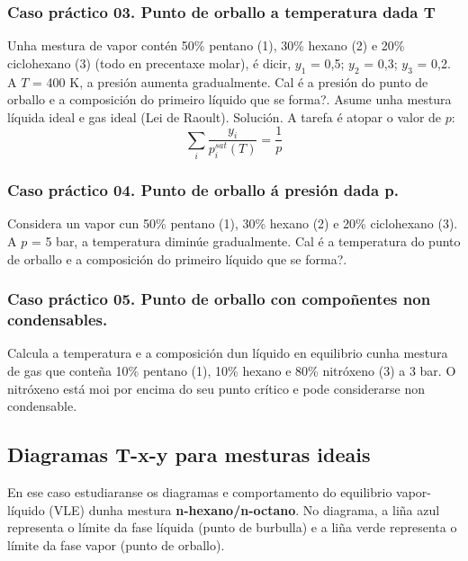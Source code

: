 \documentclass[
  letterpaper,
  DIV=11,
  numbers=noendperiod]{scrartcl}
\begin{document}
\subsubsection{Caso práctico 03. Punto de orballo a temperatura dada
T}\label{caso-pruxe1ctico-03.-punto-de-orballo-a-temperatura-dada-t}

Unha mestura de vapor contén 50\% pentano (1), 30\% hexano (2) e 20\%
ciclohexano (3) (todo en precentaxe molar), é dicir, \(y_1\) = 0,5;
\(y_2\) = 0,3; \(y_3\) = 0,2. A \(T\) = 400 K, a presión aumenta
gradualmente. Cal é a presión do punto de orballo e a composición do
primeiro líquido que se forma?. Asume unha mestura líquida ideal e gas
ideal (Lei de Raoult). Solución. A tarefa é atopar o valor de \(p\): \[
\sum_i \frac {y_i} {p_i^{sat} (T)} = \frac {1} {p}
\]

\subsubsection{Caso práctico 04. Punto de orballo á presión dada
p.}\label{caso-pruxe1ctico-04.-punto-de-orballo-uxe1-presiuxf3n-dada-p.}

Considera un vapor cun 50\% pentano (1), 30\% hexano (2) e 20\%
ciclohexano (3). A \(p\) = 5 bar, a temperatura diminúe gradualmente.
Cal é a temperatura do punto de orballo e a composición do primeiro
líquido que se forma?.

\subsubsection{Caso práctico 05. Punto de orballo con compoñentes non
condensables.}\label{caso-pruxe1ctico-05.-punto-de-orballo-con-compouxf1entes-non-condensables.}

Calcula a temperatura e a composición dun líquido en equilibrio cunha
mestura de gas que conteña 10\% pentano (1), 10\% hexano e 80\%
nitróxeno (3) a 3 bar. O nitróxeno está moi por encima do seu punto
crítico e pode considerarse non condensable.

\subsection{Diagramas T-x-y para mesturas
ideais}\label{diagramas-t-x-y-para-mesturas-ideais}

En ese caso estudiaranse os diagramas e comportamento do equilibrio
vapor-líquido (VLE) dunha mestura \textbf{n-hexano/n-octano}. No
diagrama, a liña azul representa o límite da fase líquida (punto de
burbulla) e a liña verde representa o límite da fase vapor (punto de
orballo).
\end{document}
